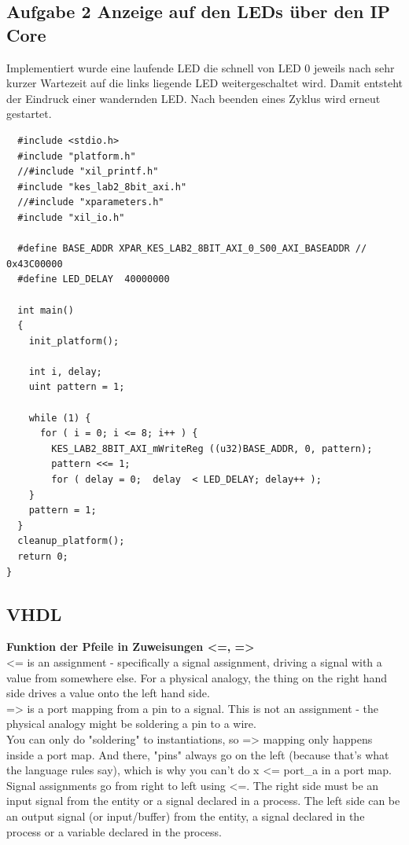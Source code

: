 \subsection{Aufgabe 2 Anzeige auf den LEDs über den IP Core}
Implementiert wurde eine laufende LED die schnell von LED 0 jeweils nach sehr kurzer Wartezeit auf die links 
liegende LED weitergeschaltet wird. Damit entsteht der Eindruck einer wandernden LED. Nach beenden eines 
Zyklus wird erneut gestartet.

\begin{verbatim}
  #include <stdio.h>
  #include "platform.h"
  //#include "xil_printf.h" 
  #include "kes_lab2_8bit_axi.h"
  //#include "xparameters.h"
  #include "xil_io.h"

  #define BASE_ADDR XPAR_KES_LAB2_8BIT_AXI_0_S00_AXI_BASEADDR // 0x43C00000
  #define LED_DELAY  40000000

  int main()
  {
    init_platform();

    int i, delay;
    uint pattern = 1;

    while (1) {
      for ( i = 0; i <= 8; i++ ) {
        KES_LAB2_8BIT_AXI_mWriteReg ((u32)BASE_ADDR, 0, pattern);
        pattern <<= 1;
        for ( delay = 0;  delay  < LED_DELAY; delay++ );
    }
    pattern = 1;
  }
  cleanup_platform();
  return 0;
}
\end{verbatim}



\subsection{VHDL}

\textbf{Funktion der Pfeile in Zuweisungen  <=, =>}\\
<= is an assignment - specifically a signal assignment, driving a signal with a value from somewhere else. For a physical analogy, the thing on the right hand side drives a value onto the left hand side.\\

=> is a port mapping from a pin to a signal. This is not an assignment - the physical analogy might be soldering a pin to a wire.\\

You can only do "soldering" to instantiations, so => mapping only happens inside a port map. And there, "pins" always go on the left (because that's what the language rules say), which is why you can't do x <= port\_a in a port map.\\

Signal assignments go from right to left using <=. The right side must be an input signal from the entity or a signal declared in a process. The left side can be an output signal (or input/buffer) from the entity, a signal declared in the process or a variable declared in the process.\\


